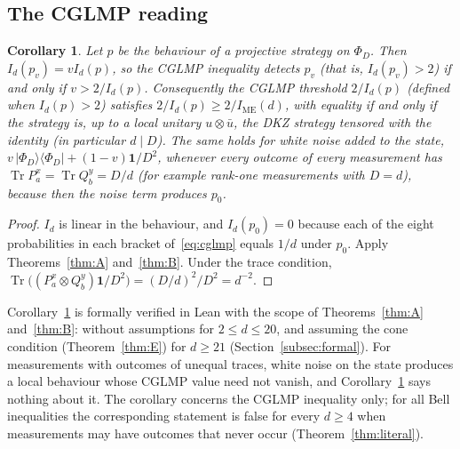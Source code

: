 \documentclass[11pt]{amsart}
\newtheorem{corollary}[theorem]{Corollary}
\theoremstyle{definition}
\theoremstyle{remark}
\numberwithin{equation}{section}
\newcommand{\Tr}{\operatorname{Tr}}
\newcommand{\IME}{I_{\mathrm{ME}}}
\newcommand{\one}{\mathbf{1}}
\begin{document}
\subsection{The CGLMP reading}\label{subsec:cglmpnoise}
\begin{corollary}\label{cor:noise}
Let $p$ be the behaviour of a projective strategy on $\Phi_D$. Then $I_d(p_v)=vI_d(p)$, so the CGLMP inequality detects
$p_v$ (that is, $I_d(p_v)>2$) if and only if $v>2/I_d(p)$. Consequently the CGLMP threshold $2/I_d(p)$ (defined when
$I_d(p)>2$) satisfies $2/I_d(p)\ge2/\IME(d)$, with equality if and only if the strategy is, up to a local unitary
$u\otimes\bar u$, the DKZ strategy tensored with the identity (in particular $d\mid D$). The same holds for white noise
added to the state, $v\,|\Phi_D\rangle\langle\Phi_D|+(1-v)\one/D^2$, whenever every outcome of every measurement has
$\Tr P^x_a=\Tr Q^y_b=D/d$ (for example rank-one measurements with $D=d$), because then the noise term produces $p_0$.
\end{corollary}

\begin{proof}
$I_d$ is linear in the behaviour, and $I_d(p_0)=0$ because each of the eight probabilities in each bracket
of~\eqref{eq:cglmp} equals $1/d$ under $p_0$. Apply Theorems~\ref{thm:A} and~\ref{thm:B}. Under the trace condition,
$\Tr\bigl((P^x_a\otimes Q^y_b)\one/D^2\bigr)=(D/d)^2/D^2=d^{-2}$.
\end{proof}

Corollary~\ref{cor:noise} is formally verified in Lean with the scope of Theorems~\ref{thm:A} and~\ref{thm:B}: without
assumptions for $2\le d\le20$, and assuming the cone condition (Theorem~\ref{thm:E}) for $d\ge21$
(Section~\ref{subsec:formal}). For measurements with outcomes of unequal traces, white noise on the state produces a
local behaviour whose CGLMP value need not vanish, and Corollary~\ref{cor:noise} says nothing about it. The corollary
concerns the CGLMP inequality only; for all Bell inequalities the corresponding statement is false for every $d\ge4$
when measurements may have outcomes that never occur (Theorem~\ref{thm:literal}).
\end{document}
